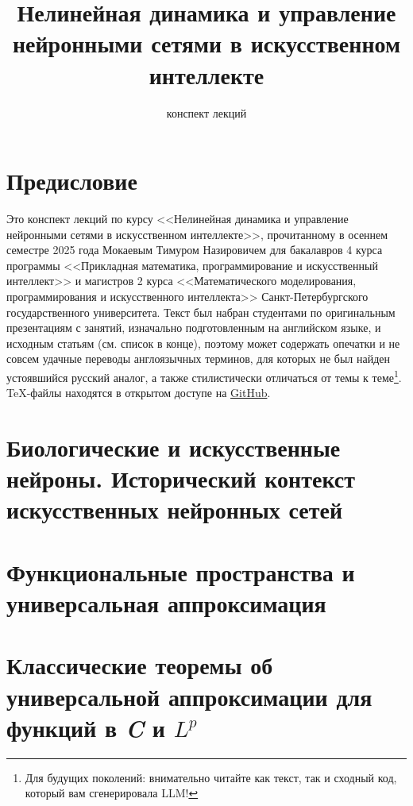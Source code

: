 \documentclass[titlepage, a4paper, 12pt]{article}
\theoremstyle{definition}
\theoremstyle{plain}
\theoremstyle{remark}
\begin{document}
\begin{titlepage}
  \title{Нелинейная динамика и управление нейронными сетями в искусственном интеллекте}
  \author{конспект лекций}
  \date{}
  \maketitle
\end{titlepage}

\section*{Предисловие}
Это конспект лекций по курсу <<Нелинейная динамика и управление нейронными сетями в искусственном интеллекте>>, прочитанному в осеннем семестре 2025 года Мокаевым Тимуром Назировичем для бакалавров 4 курса программы <<Прикладная математика, программирование и искусственный интеллект>> и магистров 2 курса <<Математического моделирования, программирования и искусственного интеллекта>> Санкт-Петербургского государственного университета.
Текст был набран студентами по оригинальным презентациям с занятий, изначально подготовленным на английском языке, и исходным статьям (см. список в конце), поэтому может содержать опечатки и не совсем удачные переводы англоязычных терминов, для которых не был найден устоявшийся русский аналог, а также стилистически отличаться от темы к теме\footnote{Для будущих поколений: внимательно читайте как текст, так и сходный код, который вам сгенерировала LLM!}.
\TeX-файлы находятся в открытом доступе на \hyperref{https://github.com/IKurkov/Nonlinear_dynamics_and_control_of_neural_networks_in_AI}{}{}{GitHub}{}.

\tableofcontents
\newpage
\section{Биологические и искусственные нейроны. Исторический контекст искусственных нейронных сетей}


\newpage

\section{Функциональные пространства и универсальная аппроксимация}



\newpage

\section{Классические теоремы об универсальной аппроксимации для функций в \textit{C} и $L^p$}


\newpage
\end{document}
